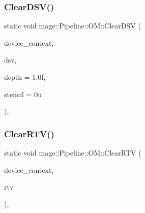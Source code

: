 \hypertarget{structmage_1_1_pipeline_1_1_o_m_aa8cb14de927cbb9419adfb652d083006}{}\label{structmage_1_1_pipeline_1_1_o_m_aa8cb14de927cbb9419adfb652d083006} 
\subsubsection{\texorpdfstring{Clear\+D\+S\+V()}{ClearDSV()}}
{\footnotesize\ttfamily static void mage\+::\+Pipeline\+::\+O\+M\+::\+Clear\+D\+SV (\begin{DoxyParamCaption}\item[{I\+D3\+D11\+Device\+Context2 $\ast$}]{device\+\_\+context,  }\item[{I\+D3\+D11\+Depth\+Stencil\+View $\ast$}]{dsv,  }\item[{\hyperlink{namespacemage_aa97e833b45f06d60a0a9c4fc22ae02c0}{F32}}]{depth = {\ttfamily 1.0f},  }\item[{\hyperlink{namespacemage_afc638980bc6154f15af5e2d93a0e0ea9}{U8}}]{stencil = {\ttfamily 0u} }\end{DoxyParamCaption})\hspace{0.3cm}{\ttfamily [static]}, {\ttfamily [noexcept]}}

\hypertarget{structmage_1_1_pipeline_1_1_o_m_a0a40eb7a844d2861e74582879afec962}{}\label{structmage_1_1_pipeline_1_1_o_m_a0a40eb7a844d2861e74582879afec962} 
\subsubsection{\texorpdfstring{Clear\+R\+T\+V()}{ClearRTV()}\hspace{0.1cm}{\footnotesize\ttfamily [1/2]}}
{\footnotesize\ttfamily static void mage\+::\+Pipeline\+::\+O\+M\+::\+Clear\+R\+TV (\begin{DoxyParamCaption}\item[{I\+D3\+D11\+Device\+Context2 $\ast$}]{device\+\_\+context,  }\item[{I\+D3\+D11\+Render\+Target\+View $\ast$}]{rtv }\end{DoxyParamCaption})\hspace{0.3cm}{\ttfamily [static]}, {\ttfamily [noexcept]}}

\hypertarget{structmage_1_1_pipeline_1_1_o_m_a0e83357b9289a95ecedc6c940c26d957}{}\label{structmage_1_1_pipeline_1_1_o_m_a0e83357b9289a95ecedc6c940c26d957} 
